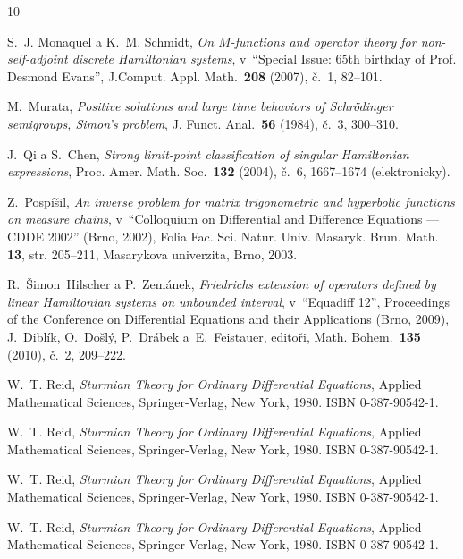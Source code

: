 \begin{thebibliography}{10}

S.~J. Monaquel a K.~M. Schmidt, \textit{On $M$-functions and operator
  theory for non-self-adjoint discrete Hamiltonian systems}, v~``Special
  Issue: 65th birthday of Prof. Desmond Evans'', J.Comput. Appl. 
  Math.~\textbf{208} (2007), \v{c}.~1, 82--101.

M.~Murata, \textit{Positive solutions and large time behaviors of
  Schrödinger semigroups, Simon's problem}, J. Funct. Anal.~\textbf{56}
  (1984), č.~3, 300--310.

J.~Qi a S.~Chen, \textit{Strong limit-point classification of singular
  Hamiltonian expressions}, Proc. Amer. Math. Soc.~\textbf{132} (2004),
  č.~6, 1667--1674 (elektronicky).

Z.~Pospíšil, \textit{An inverse problem for matrix trigonometric and
  hyperbolic functions on measure chains}, v~``Colloquium on Differential
  and Difference Equations --- CDDE 2002'' (Brno, 2002), Folia Fac.
  Sci. Natur. Univ. Masaryk. Brun. Math. {\bf 13}, str. 205--211, Masarykova
  univerzita, Brno, 2003.

R.~Šimon~Hilscher a P.~Zemánek, \textit{Friedrichs extension of
  operators defined by linear Hamiltonian systems on unbounded interval}, 
  v~``Equadiff 12'', Proceedings of the Conference on Differential Equations and
  their Applications (Brno, 2009), J.~Diblík, O.~Došlý, P.~Drábek 
  a~E.~Feistauer, editoři, Math. Bohem.~\textbf{135} (2010),
  č.~2, 209--222.

W.~T. Reid, \textit{Sturmian Theory for Ordinary Differential Equations}, Applied 
  Mathematical Sciences, Springer-Verlag, New York, 1980. 
  ISBN 0-387-90542-1.

W.~T. Reid, \textit{Sturmian Theory for Ordinary Differential Equations}, Applied 
  Mathematical Sciences, Springer-Verlag, New York, 1980. 
  ISBN 0-387-90542-1.

W.~T. Reid, \textit{Sturmian Theory for Ordinary Differential Equations}, Applied 
  Mathematical Sciences, Springer-Verlag, New York, 1980. 
  ISBN 0-387-90542-1.

W.~T. Reid, \textit{Sturmian Theory for Ordinary Differential Equations}, Applied 
  Mathematical Sciences, Springer-Verlag, New York, 1980. 
  ISBN 0-387-90542-1.


\end{thebibliography}
